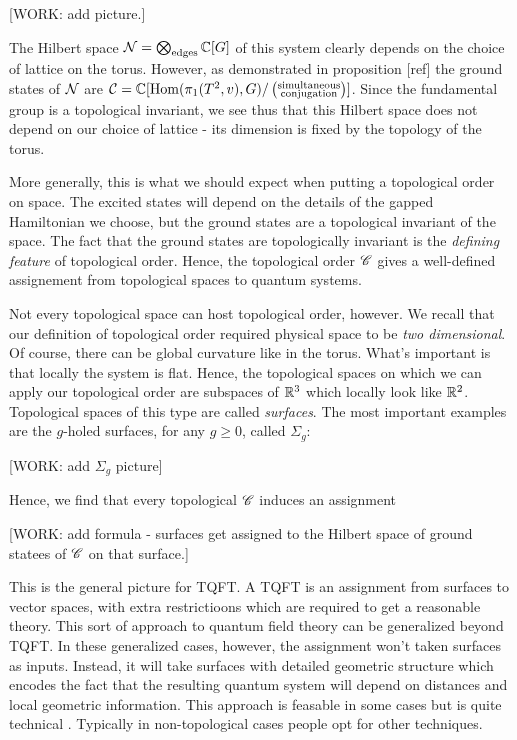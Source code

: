 [WORK: add picture.]

The Hilbert space $\mathcal{N}=\bigotimes_{\text{edges}}\mathbb{C}[G]$ of this system clearly depends on the choice of lattice on the torus. However, as demonstrated in proposition [ref] the ground states of $\mathcal{N}$ are $\mathcal{C}=\mathbb{C}[\operatorname{Hom}(\pi_1(T^2,v), G)/\left(\substack{\text{simultaneous} \\ \text{conjugation}}\right)]$. Since the fundamental group is a topological invariant, we see thus that this Hilbert space does not depend on our choice of lattice - its dimension is fixed by the topology of the torus.

More generally, this is what we should expect when putting a topological order on space. The excited states will depend on the details of the gapped Hamiltonian we choose, but the ground states are a topological invariant of the space. The fact that the ground states are topologically invariant is the \textit{defining feature} of topological order. Hence, the topological order $\mathscr{C}$ gives a well-defined assignement from topological spaces to quantum systems.

Not every topological space can host topological order, however. We recall that our definition of topological order required physical space to be \textit{two dimensional}. Of course, there can be global curvature like in the torus. What's important is that locally the system is flat. Hence, the topological spaces on which we can apply our topological order are subspaces of $\mathbb{R}^3$ which locally look like $\mathbb{R}^2$. Topological spaces of this type are called \textit{surfaces}. The most important examples are the $g$-holed surfaces, for any $g\geq 0$, called $\Sigma_g$:

[WORK: add $\Sigma_g$ picture]

Hence, we find that every topological $\mathscr{C}$ induces an assignment

[WORK: add formula - surfaces get assigned to the Hilbert space of ground statees of $\mathscr{C}$ on that surface.]

This is the general picture for TQFT. A TQFT is an assignment from surfaces to vector spaces, with extra restrictioons which are required to get a reasonable theory. This sort of approach to quantum field theory can be generalized beyond TQFT. In these generalized cases, however, the assignment won't taken surfaces as inputs. Instead, it will take surfaces with detailed geometric structure which encodes the fact that the resulting quantum system will depend on distances and local geometric information. This approach is feasable in some cases but is quite technical \cite{segal1988definition}. Typically in non-topological cases people opt for other techniques.

